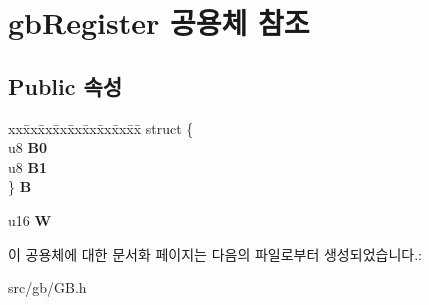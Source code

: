 \hypertarget{uniongb_register}{}\section{gb\+Register 공용체 참조}
\label{uniongb_register}
\subsection*{Public 속성}
\begin{DoxyCompactItemize}
\item 
\mbox{\label{uniongb_register_a038dba01c9bc9f3d72a2d49094319cb5}} 
\begin{tabbing}
xx\=xx\=xx\=xx\=xx\=xx\=xx\=xx\=xx\=\kill
struct \{\\
\>u8 {\bfseries B0}\\
\>u8 {\bfseries B1}\\
\} {\bfseries B}\\

\end{tabbing}\item 
\mbox{\label{uniongb_register_ab3d596e48605bc14793ff0292e6ed814}} 
u16 {\bfseries W}
\end{DoxyCompactItemize}


이 공용체에 대한 문서화 페이지는 다음의 파일로부터 생성되었습니다.\+:\begin{DoxyCompactItemize}
\item 
src/gb/G\+B.\+h\end{DoxyCompactItemize}
